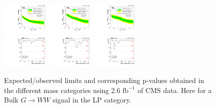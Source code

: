 \begin{figure}[h!]
\centering
\includegraphics[width=0.20\textwidth]{figures/analysis/search1/AN-15-211/limits/brazilianFlag_BulkWW_WWLP_13TeV_wPDF.pdf}
\includegraphics[width=0.20\textwidth]{figures/analysis/search1/AN-15-211/limits/brazilianFlag_BulkWW_WZLP_13TeV_wPDF.pdf}
\includegraphics[width=0.20\textwidth]{figures/analysis/search1/AN-15-211/limits/brazilianFlag_BulkWW_ZZLP_13TeV_wPDF.pdf}\\
\includegraphics[width=0.20\textwidth]{figures/analysis/search1/AN-15-211/pvalues/pvalue_BulkWWinWW_low_purity.pdf}
\includegraphics[width=0.20\textwidth]{figures/analysis/search1/AN-15-211/pvalues/pvalue_BulkWWinWZ_low_purity.pdf}
\includegraphics[width=0.20\textwidth]{figures/analysis/search1/AN-15-211/pvalues/pvalue_BulkWWinZZ_low_purity.pdf}
\caption{Expected/observed limits and corresponding p-values obtained in the different mass categories using 2.6 $\textrm{fb}^{-1}$ of CMS data. Here for a Bulk $G\rightarrow WW$ signal in the LP category.}
\label{fig:searchI:Limits_LPBulkWW}
\end{figure}


